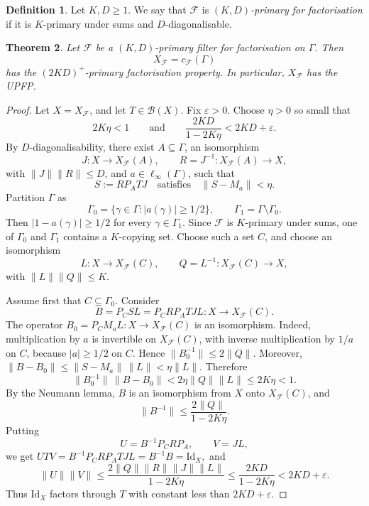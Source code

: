 \documentclass[11pt]{amsart}
\theoremstyle{plain}
\newtheorem{theorem}{Theorem}[section]
\theoremstyle{definition}
\newtheorem{definition}[theorem]{Definition}
\numberwithin{equation}{section}
\renewcommand{\leq}{\leqslant}
\renewcommand{\geq}{\geqslant}
\begin{document}
\begin{definition}\label{def:factorisation-primary-filter}
Let \(K,D\geq 1\).  We say that \(\mathcal F\) is
\emph{\((K,D)\)-primary for factorisation} if it is \(K\)-primary under sums and \(D\)-diagonalisable.
\end{definition}

\begin{theorem}\label{thm:primary-filter-pfp}
Let \(\mathcal F\) be a \((K,D)\)-primary filter for factorisation on \(\Gamma\). Then
\[
    X_{\mathcal F}=c_{\mathcal F}(\Gamma)
\]
has the \((2KD)^+\)-primary factorisation property.  In particular, \(X_{\mathcal F}\) has the UPFP.
\end{theorem}

\begin{proof}
Let \(X=X_{\mathcal F}\), and let \(T\in\mathcal B(X)\).  Fix \(\varepsilon>0\).  Choose \(\eta>0\) so small that
\[
    2K\eta<1
    \qquad\text{and}\qquad
    \frac{2KD}{1-2K\eta}<2KD+\varepsilon .
\]
By \(D\)-diagonalisability, there exist \(A\subseteq\Gamma\), an isomorphism
\[
    J\colon X\longrightarrow X_{\mathcal F}(A),
    \qquad
    R=J^{-1}\colon X_{\mathcal F}(A)\longrightarrow X,
\]
with \(\|J\|\|R\|\leq D\), and \(a\in\ell_\infty(\Gamma)\), such that
\[
    S:=R P_A T J
    \quad\text{satisfies}\quad
    \|S-M_a\|<\eta .
\]
Partition \(\Gamma\) as
\[
    \Gamma_0=\{\gamma\in\Gamma: |a(\gamma)|\geq 1/2\},
    \qquad
    \Gamma_1=\Gamma\setminus\Gamma_0.
\]
Then \(|1-a(\gamma)|\geq 1/2\) for every \(\gamma\in\Gamma_1\).  Since
\(\mathcal F\) is \(K\)-primary under sums, one of \(\Gamma_0\) and
\(\Gamma_1\) contains a \(K\)-copying set.  Choose such a set \(C\), and choose an isomorphism
\[
    L\colon X\longrightarrow X_{\mathcal F}(C),
    \qquad
    Q=L^{-1}\colon X_{\mathcal F}(C)\longrightarrow X,
\]
with \(\|L\|\|Q\|\leq K\).

Assume first that \(C\subseteq\Gamma_0\). Consider
\[
    B=P_C S L=P_C R P_A T J L
    \colon X\longrightarrow X_{\mathcal F}(C).
\]
The operator
\(
    B_0=P_C M_a L\colon X\longrightarrow X_{\mathcal F}(C)
\)
is an isomorphism. Indeed, multiplication by \(a\) is invertible on
\(X_{\mathcal F}(C)\), with inverse multiplication by \(1/a\) on \(C\), because \(|a|\geq 1/2\) on \(C\). Hence
\(
    \|B_0^{-1}\|\leq 2\|Q\|.
\)
Moreover,
\(
    \|B-B_0\|
    \leq \|S-M_a\|\,\|L\|
    <\eta\|L\|.
\)
Therefore
\[
    \|B_0^{-1}\|\,\|B-B_0\|
    <2\eta\|Q\|\|L\|
    \leq 2K\eta<1.
\]
By the Neumann lemma, \(B\) is an isomorphism from \(X\) onto \(X_{\mathcal F}(C)\), and
\[
    \|B^{-1}\|
    \leq \frac{2\|Q\|}{1-2K\eta}.
\]
Putting
\[
    U=B^{-1}P_C R P_A,
    \qquad
    V=J L,
\]
we get
\(
    U T V=B^{-1}P_C R P_A T J L=B^{-1}B=\mathrm{Id}_X,
\)
and
\[
    \|U\|\|V\|
    \leq
    \frac{2\|Q\|\|R\|\|J\|\|L\|}{1-2K\eta}
    \leq
    \frac{2KD}{1-2K\eta}
    <2KD+\varepsilon .
\]
Thus \(\mathrm{Id}_X\) factors through \(T\) with constant less than
\(2KD+\varepsilon\).


\end{proof}
\end{document}
